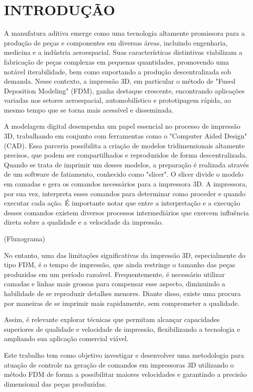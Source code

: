 \chapter{INTRODUÇÃO}
A manufatura aditiva emerge como uma tecnologia altamente promissora para a produção de peças e componentes em diversas áreas, incluindo engenharia, medicina e a indústria aeroespacial. Suas características distintivas viabilizam a fabricação de peças complexas em pequenas quantidades, promovendo uma notável iterabilidade, bem como suportando a produção descentralizada sob demanda. Nesse contexto, a impressão 3D, em particular o método de "Fused Deposition Modeling" (FDM), ganha destaque crescente, encontrando aplicações variadas nos setores aeroespacial, automobilístico e prototipagem rápida, ao mesmo tempo que se torna mais acessível e disseminada.

A modelagem digital desempenha um papel essencial no processo de impressão 3D, trabalhando em conjunto com ferramentas como o "Computer Aided Design" (CAD). Essa parceria possibilita a criação de modelos tridimensionais altamente precisos, que podem ser compartilhados e reproduzidos de forma descentralizada. Quando se trata de imprimir um desses modelos, a preparação é realizada através de um software de fatiamento, conhecido como "slicer". O slicer divide o modelo em camadas e gera os comandos necessários para a impressora 3D. A impressora, por sua vez, interpreta esses comandos para determinar como proceder e quando executar cada ação. É importante notar que entre a interpretação e a execução desses comandos existem diversos processos intermediários que exercem influência direta sobre a qualidade e a velocidade da impressão.

(Fluxograma)

No entanto, uma das limitações significativas da impressão 3D, especialmente do tipo FDM, é o tempo de 
impressão, que ainda restringe o tamanho das peças produzidas em um período razoável. Frequentemente, é 
necessário utilizar camadas e linhas mais grossas para compensar esse aspecto, diminuindo a habilidade de
se reproduzir detalhes menores. Diante disso, existe uma procura por maneiras de se imprimir mais rapidamente, 
sem comprometer a qualidade.

Assim, é relevante explorar técnicas que permitam alcançar capacidades superiores de qualidade e 
velocidade de impressão, flexibilizando a tecnologia e ampliando sua aplicação comercial viável. 

Este trabalho tem como objetivo investigar e desenvolver uma metodologia para atuação de controle na geração de
comandos em impressoras 3D utilizando o método FDM de forma a possibilitar maiores velocidades e garantindo a precisão dimensional das peças produzidas.